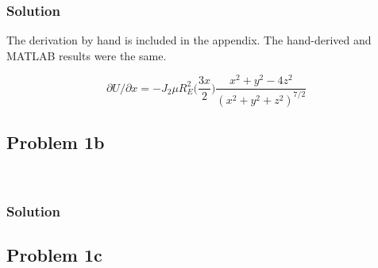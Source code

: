 \documentclass[conf]{new-aiaa}
\begin{document}

\subsubsection*{Solution} 


The derivation by hand is included in the appendix. The hand-derived and MATLAB results were the same. 

\begin{equation}
	\partial U / \partial x = -J_2 \mu R_E^2 \Big( \dfrac{3x}{2} \Big) \dfrac{ x^2 + y^2 - 4z^2 }{ (x^2 + y^2 + z^2)^{7/2} }
\end{equation}



\subsection*{Problem 1b} 

\begin{center}
	 \\
\end{center}


\subsubsection*{Solution} 




\subsection*{Problem 1c} 
\end{document}
